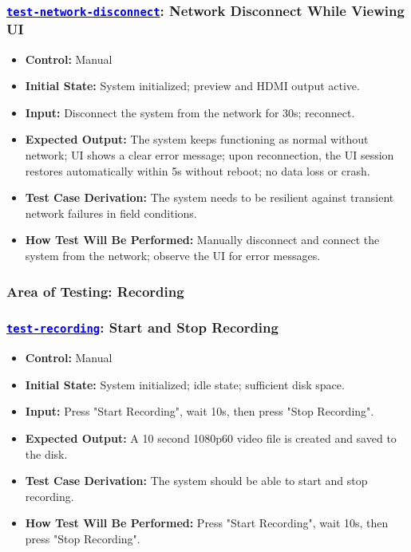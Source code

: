 \documentclass[12pt, titlepage]{article}
\newcommand{\tid}[1]{\hyperlink{tid:#1}{\textcolor{blue}{\texttt{#1}}}}
\begin{document}
\subsubsection*{\tid{test-network-disconnect}: Network Disconnect While Viewing UI}
\begin{itemize}
  \item \textbf{Control:} Manual
  \item \textbf{Initial State:} System initialized; preview and HDMI output active.
  \item \textbf{Input:} Disconnect the system from the network for 30s; reconnect.
  \item \textbf{Expected Output:} The system keeps functioning as normal without network; UI shows a clear error message; upon reconnection, the UI session restores automatically within 5s without reboot; no data loss or crash.
  \item \textbf{Test Case Derivation:} The system needs to be resilient against transient network failures in field conditions.
  \item \textbf{How Test Will Be Performed:} Manually disconnect and connect the system from the network; observe the UI for error messages.
\end{itemize}

\subsubsection{Area of Testing: Recording}

\subsubsection*{\tid{test-recording}: Start and Stop Recording}
\begin{itemize}
  \item \textbf{Control:} Manual
  \item \textbf{Initial State:} System initialized; idle state; sufficient disk space.
  \item \textbf{Input:} Press "Start Recording", wait 10s, then press "Stop Recording".
  \item \textbf{Expected Output:} A 10 second 1080p60 video file is created and saved to the disk.
  \item \textbf{Test Case Derivation:} The system should be able to start and stop recording.
  \item \textbf{How Test Will Be Performed:} Press "Start Recording", wait 10s, then press "Stop Recording".
\end{itemize}
\end{document}
